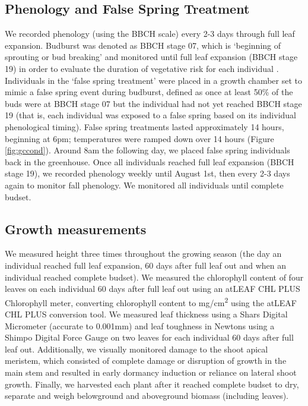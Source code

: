 \documentclass{article}\usepackage[]{graphicx}\usepackage[]{color}
\begin{document}
\subsection*{Phenology and False Spring Treatment}
We recorded phenology (using the BBCH scale) every 2-3 days through full leaf expansion. Budburst was denoted as BBCH stage 07, which is `beginning of sprouting or bud breaking' and monitored until full leaf expansion (BBCH stage 19) in order to evaluate the duration of vegetative risk \citep{Chamberlain2019} for each individual \citep{Finn2007}. Individuals in the `false spring treatment' were placed in a growth chamber set to mimic a false spring event during budburst, defined as once at least 50\% of the buds were at BBCH stage 07 but the individual had not yet reached BBCH stage 19 (that is, each individual was exposed to a false spring based on its individual phenological timing). False spring treatments lasted approximately 14 hours, beginning at 6pm; temperatures were ramped down over 14 hours (Figure \ref{fig:gccond}). Around 8am the following day, we placed false spring individuals back in the greenhouse. Once all individuals reached full leaf expansion (BBCH stage 19), we recorded phenology weekly until August 1st, then every 2-3 days again to monitor fall phenology. We monitored all individuals until complete budset. 

\subsection*{Growth measurements}
We measured height three times throughout the growing season (the day an individual reached full leaf expansion, 60 days after full leaf out and when an individual reached complete budset). We measured the chlorophyll content of four leaves on each individual 60 days after full leaf out using an atLEAF CHL PLUS Chlorophyll meter, converting chlorophyll content to mg/cm\textsuperscript{2} using the atLEAF CHL PLUS conversion tool. We measured leaf thickness using a Shars Digital Micrometer (accurate to 0.001mm) and leaf toughness in Newtons using a Shimpo Digital Force Gauge on two leaves for each individual 60 days after full leaf out. Additionally, we visually monitored damage to the shoot apical meristem, which consisted of complete damage or disruption of growth in the main stem and resulted in early dormancy induction or reliance on lateral shoot growth. Finally, we harvested each plant after it reached complete budset to dry, separate and weigh belowground and aboveground biomass (including leaves). 
\end{document}
